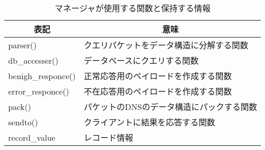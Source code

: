 \begin{table}[htbp]
 \caption{マネージャが使用する関数と保持する情報}
 \centering
  \begin{tabular}{ll}
    \toprule
		\multicolumn{1}{c}{\textbf{表記}} & \multicolumn{1}{c}{\textbf{意味}} \\
    \midrule
		parser() & クエリパケットをデータ構造に分解する関数 \\
		db\_accesser() & データベースにクエリする関数 \\
		benigh\_responce() & 正常応答用のペイロードを作成する関数 \\
		error\_responce() & 不在応答用のペイロードを作成する関数 \\
		pack() & パケットのDNSのデータ構造にパックする関数 \\
		sendto() & クライアントに結果を応答する関数 \\
		record\_value & レコード情報 \\
    \bottomrule
  \end{tabular}
 \label{tab:discription-manager}
\end{table}
